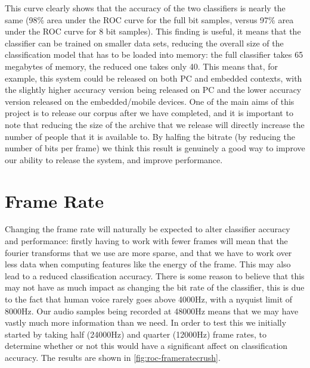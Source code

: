 \documentclass[ %
                    author={Sam Phippen},
                supervisor={Dr. Rafal Bogacz},
                     title={Real time voice activity detectors in noisy personal computing environments},
                  subtitle={},
                    degree={MEng},
                      year={2012} ]{thesis}
\begin{document}
This curve clearly shows that the accuracy of the two classifiers is nearly the
same (98\% area under the ROC curve for the full bit samples, versus 97\% area
under the ROC curve for 8 bit samples). This finding is useful, it means that
the classifier can be trained on smaller data sets, reducing the overall size
of the classification model that has to be loaded into memory: the full
classifier takes 65 megabytes of memory, the reduced one takes only 40. This
means that, for example, this system could be released on both PC and embedded
contexts, with the slightly higher accuracy version being released on PC and
the lower accuracy version released on the embedded/mobile devices. One of the
main aims of this project is to release our corpus after we have completed, and
it is important to note that reducing the size of the archive that we release
will directly increase the number of people that it is available to. By halfing
the bitrate (by reducing the number of bits per frame) we think this result is
genuinely a good way to improve our ability to release the system, and improve
performance.

\section{Frame Rate}

Changing the frame rate will naturally be expected to alter classifier accuracy
and performance: firstly having to work with fewer frames will mean that the
fourier transforms that we use are more sparse, and that we have to work over
less data when computing features like the energy of the frame. This may also
lead to a reduced classification accuracy. There is some reason to believe that
this may not have as much impact as changing the bit rate of the classifier,
this is due to the fact that human voice rarely goes above 4000Hz, with a
nyquist limit of 8000Hz. Our audio samples being recorded at 48000Hz means
that we may have vastly much more information than we need. In order to test
this we initially started by taking half (24000Hz) and quarter (12000Hz) frame
rates, to determine whether or not this would have a significant affect on
classification accuracy. The results are shown in \ref{fig:roc-frameratecrush}.
\end{document}
